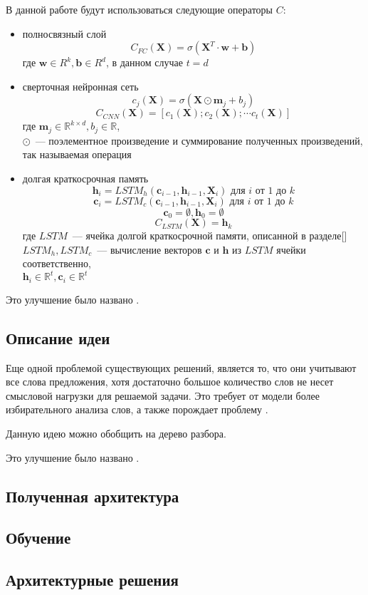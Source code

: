 \vspace{5mm}

\noindent В данной работе будут использоваться следующие операторы $C$:
\begin{itemize}
    \item{полносвязный слой}
        $$C_{FC}(\pmb{X})=\sigma(\pmb{X}^T \cdot \pmb{w} + \pmb{b})$$
        где $\pmb{w} \in R^k, \pmb{b} \in R^d$, в данном случае $t=d$
    \item{сверточная нейронная сеть}
        $$c_j(\pmb{X})=\sigma(\pmb{X} \odot \pmb{m}_j + b_j)$$
        $$C_{CNN}(\pmb{X})=[c_1(\pmb{X}); c_2(\pmb{X}); \cdots c_t(\pmb{X})]$$
        где $\pmb{m}_j \in \mathbb{R}^{k \times d}, b_j \in \mathbb{R}$,\\
        $\odot$~--- поэлементное произведение и суммирование полученных произведений, 
        так называемая операция 
    \item{долгая краткосрочная память}
    $$\pmb{h}_i=LSTM_h(\pmb{c}_{i-1}, \pmb{h}_{i-1}, \pmb{X}_i) \text{ для } i \text{ от } 1 \text { до } k$$  
    $$\pmb{c}_i=LSTM_c(\pmb{c}_{i-1}, \pmb{h}_{i-1}, \pmb{X}_i) \text{ для } i \text{ от } 1 \text { до } k$$ 
    $$\pmb{c}_0 = \emptyset, \pmb{h}_0 = \emptyset$$
    $$C_{LSTM}(\pmb{X}) = \pmb{h}_k$$
    где $LSTM$~--- ячейка долгой краткосрочной памяти, описанной в разделе[]\\
    $LSTM_h, LSTM_c$~--- вычисление векторов $\pmb{c}$ и $\pmb{h}$ из $LSTM$ ячейки соответственно,\\
    $\pmb{h}_i \in \mathbb{R}^t, \pmb{c}_i \in \mathbb{R}^t$
\end{itemize}

\noindent Это улучшение было названо .

\subsection{Описание идеи } 
Еще одной проблемой существующих решений, является то, 
что они учитывают все слова предложения, 
хотя достаточно большое количество слов не несет смысловой нагрузки для решаемой задачи.
Это требует от модели более избирательного анализа слов, а также порождает проблему .


Данную идею можно обобщить на дерево разбора.

Это улучшение было названо .

\subsection{Полученная архитектура}

\subsection{Обучение}

\subsection{Архитектурные решения}
 